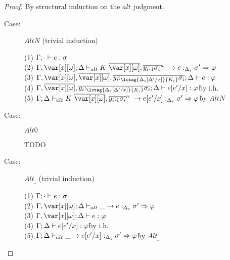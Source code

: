 \begin{proof}
By structural induction on the $alt$ judgment.

\begin{description}
\item[Case:] $AltN$ (trivial induction)
\begin{tabbing}
    (1) $\Gamma; \cdot \vdash e : \sigma$\\
    (2) $\G,\xo;\D \vdash_{alt} \konstructor~\to e :_{\D_s} \s' \Rightarrow \vp$\\
    (3) $\G,\xo,\ov{\xo},\ov{y_i{:}_{\lctag{\subst{\D_s}{\D'}{x}}{K_i}}\s_i}; \D \vdash e : \vp $\\
    (4) $\G,\ov{\xo},\ov{y_i{:}_{\lctag{\subst{\D_s}{\D'}{x}}{K_i}}\s_i}; \D \vdash e[e'/x] : \vp $\` by i.h.\\
    (5) $\G;\D \vdash_{alt} \konstructor~\to e[e'/x] :_{\D_s} \s' \Rightarrow \vp$\` by $AltN$\\
\end{tabbing}

\item[Case:] $Alt0$
\begin{tabbing}
    TODO
\end{tabbing}

\item[Case:] $Alt_\_$ (trivial induction)
\begin{tabbing}
    (1) $\Gamma;\cdot \vdash e : \sigma$\\
    (2) $\G,\xo;\D \vdash_{alt} \_ \to e :_{\D_s} \s' \Rightarrow \vp$\\
    (3) $\G,\xo;\D \vdash e : \vp$\\
    (4) $\Gamma;\Delta \vdash e[e'/x] : \varphi$\` by i.h.\\
    (5) $\Gamma;\Delta \vdash_{alt} \_ \to e[e'/x] :_{\Delta_s} \sigma' \Rightarrow \varphi$\` by $Alt_\_$\\
\end{tabbing}

\end{description}
\end{proof}

